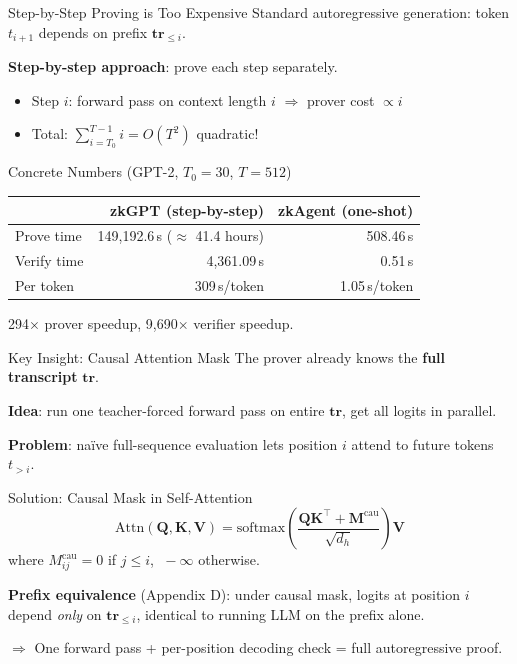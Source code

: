 \documentclass[aspectratio=169,10pt]{beamer}
\newcommand{\pos}[1]{\textcolor{positive}{#1}}
\renewcommand{\neg}[1]{\textcolor{negative}{#1}}
\newcommand{\tr}{\mathbf{tr}}
\begin{document}
\begin{frame}{Step-by-Step Proving is Too Expensive}
Standard autoregressive generation: token $t_{i+1}$ depends on prefix $\tr_{\leq i}$.

\vspace{4pt}
\textbf{Step-by-step approach}: prove each step separately.
\begin{itemize}
  \item Step $i$: forward pass on context length $i$ $\Rightarrow$ prover cost $\propto i$
  \item Total: $\sum_{i=T_0}^{T-1} i = O(T^2)$ \quad \neg{quadratic!}
\end{itemize}

\vspace{4pt}
\begin{alertblock}{Concrete Numbers (GPT-2, $T_0=30$, $T=512$)}
\begin{tabular}{@{}lrr@{}}
\toprule
& \textbf{zkGPT (step-by-step)} & \textbf{zkAgent (one-shot)} \\
\midrule
Prove time & 149,192.6\,s ($\approx$ 41.4 hours) & \pos{508.46\,s} \\
Verify time & 4,361.09\,s & \pos{0.51\,s} \\
Per token & 309\,s/token & \pos{1.05\,s/token} \\
\bottomrule
\end{tabular}
\end{alertblock}

\pos{294$\times$} prover speedup, \pos{9,690$\times$} verifier speedup.
\end{frame}

\begin{frame}{Key Insight: Causal Attention Mask}
\label{slide:masking}
The prover already knows the \textbf{full transcript} $\tr$.

\textbf{Idea}: run one teacher-forced forward pass on entire $\tr$, get all logits in parallel.

\vspace{4pt}
\textbf{Problem}: naïve full-sequence evaluation lets position $i$ attend to future tokens $t_{>i}$.

\vspace{4pt}
\begin{exampleblock}{Solution: Causal Mask in Self-Attention}
\[
  \mathrm{Attn}(\mathbf{Q}, \mathbf{K}, \mathbf{V}) = \mathrm{softmax}\!\left(\frac{\mathbf{Q}\mathbf{K}^\top + \mathbf{M}^{\mathrm{cau}}}{\sqrt{d_h}}\right)\mathbf{V}
\]
where $M^{\mathrm{cau}}_{ij} = 0$ if $j \leq i$, $\;-\infty$ otherwise.
\end{exampleblock}

\vspace{4pt}
\textbf{Prefix equivalence} (Appendix D): under causal mask, logits at position $i$ depend \emph{only} on $\tr_{\leq i}$, identical to running LLM on the prefix alone.

$\Rightarrow$ One forward pass + per-position decoding check = full autoregressive proof.
\end{frame}
\end{document}
